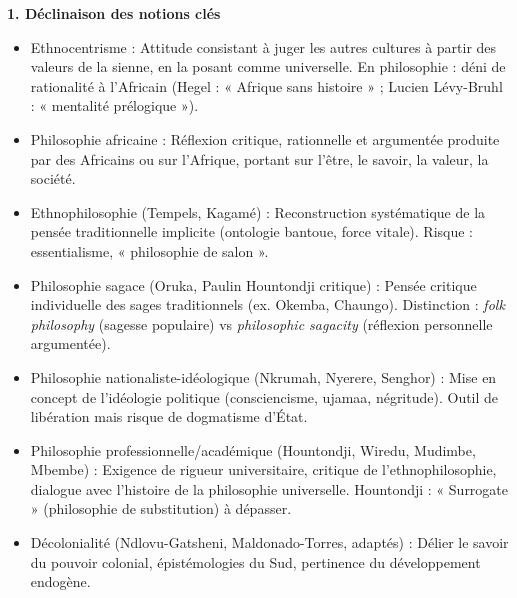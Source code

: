\documentclass[11pt]{article}
\newcommand{\cle}[1]{{\popxbold\color{popdark}#1}}
\begin{document}
\textbf{1. Déclinaison des notions clés}
\begin{itemize}
  \item \cle{Ethnocentrisme} : Attitude consistant à juger les autres cultures à partir des valeurs de la sienne, en la posant comme universelle. En philosophie : déni de rationalité à l'Africain (Hegel : « Afrique sans histoire » ; Lucien Lévy-Bruhl : « mentalité prélogique »).
  \item \cle{Philosophie africaine} : Réflexion critique, rationnelle et argumentée produite par des Africains ou sur l'Afrique, portant sur l'être, le savoir, la valeur, la société.
  \item \cle{Ethnophilosophie} (Tempels, Kagamé) : Reconstruction systématique de la pensée traditionnelle implicite (ontologie bantoue, force vitale). Risque : essentialisme, « philosophie de salon ».
  \item \cle{Philosophie sagace} (Oruka, Paulin Hountondji critique) : Pensée critique individuelle des sages traditionnels (ex. Okemba, Chaungo). Distinction : \emph{folk philosophy} (sagesse populaire) vs \emph{philosophic sagacity} (réflexion personnelle argumentée).
  \item \cle{Philosophie nationaliste-idéologique} (Nkrumah, Nyerere, Senghor) : Mise en concept de l'idéologie politique (consciencisme, ujamaa, négritude). Outil de libération mais risque de dogmatisme d'État.
  \item \cle{Philosophie professionnelle/académique} (Hountondji, Wiredu, Mudimbe, Mbembe) : Exigence de rigueur universitaire, critique de l'ethnophilosophie, dialogue avec l'histoire de la philosophie universelle. \cle{Hountondji} : « Surrogate » (philosophie de substitution) à dépasser.
  \item \cle{Décolonialité} (Ndlovu-Gatsheni, Maldonado-Torres, adaptés) : Délier le savoir du pouvoir colonial, épistémologies du Sud, pertinence du développement endogène.
\end{itemize}
\end{document}
